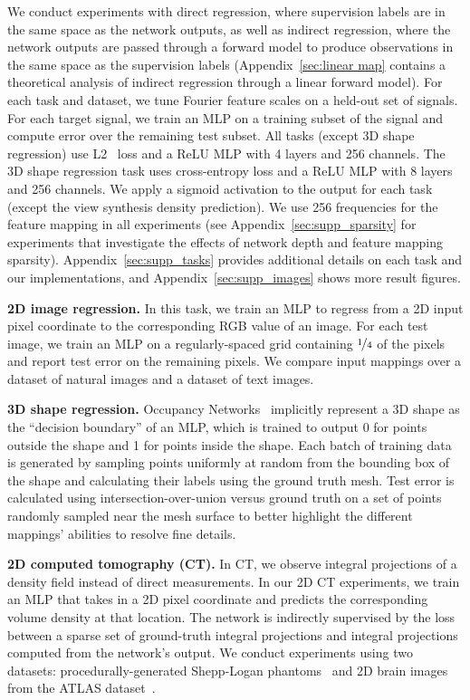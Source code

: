 We conduct experiments with direct regression, where supervision labels are in the same space as the network outputs, as well as indirect regression, where the network outputs are passed through a forward model to produce observations in the same space as the supervision labels (Appendix~\ref{sec:linear map} contains a theoretical analysis of indirect regression through a linear forward model). For each task and dataset, we tune Fourier feature scales on a held-out set of signals. For each target signal, we train an MLP on a training subset of the signal and compute error over the remaining test subset. All tasks (except 3D shape regression) use L2~ loss and a ReLU MLP with 4 layers and 256 channels. The 3D shape regression task uses cross-entropy loss and a ReLU MLP with 8 layers and 256 channels. We apply a sigmoid activation to the output for each task (except the view synthesis density prediction). We use 256 frequencies for the feature mapping in all experiments (see Appendix~\ref{sec:supp_sparsity} for experiments that investigate the effects of network depth and feature mapping sparsity). Appendix~\ref{sec:supp_tasks} provides additional details on each task and our implementations, and Appendix~\ref{sec:supp_images} shows more result figures.

{\bf 2D image regression.} In this task, we train an MLP to regress from a 2D input pixel coordinate to the corresponding RGB value of an image. For each test image, we train an MLP on a regularly-spaced grid containing $\nicefrac{1}{4}$ of the pixels and report test error on the remaining pixels. We compare input mappings over a dataset of natural images and a dataset of text images.

{\bf 3D shape regression.} Occupancy Networks~\cite{occupancynet} implicitly represent a 3D shape as the ``decision boundary'' of an MLP, which is trained to output 0 for points outside the shape and 1 for points inside the shape. Each batch of training data is generated by sampling points uniformly at random from the bounding box of the shape and calculating their labels using the ground truth mesh. Test error is calculated using intersection-over-union versus ground truth on a set of points randomly sampled near the mesh surface to better highlight the different mappings' abilities to resolve fine details.

{\bf 2D computed tomography (CT).} In CT, we observe integral projections of a density field instead of direct measurements. In our 2D CT experiments, we train an MLP that takes in a 2D pixel coordinate and predicts the corresponding volume density at that location. The network is indirectly supervised by the loss between a sparse set of ground-truth integral projections and integral projections computed from the network's output. We conduct experiments using two datasets: procedurally-generated Shepp-Logan phantoms~\cite{shepp} and 2D brain images from the ATLAS dataset~\cite{atlas}.

